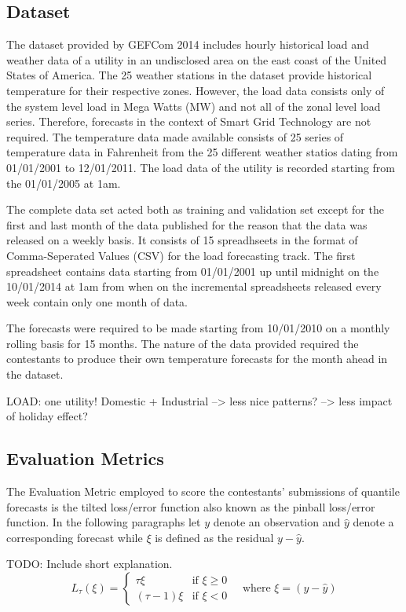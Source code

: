\documentclass[conference]{IEEEtran}
\begin{document}
\subsection{Dataset}
The dataset provided by GEFCom 2014 includes hourly historical load and weather data of a utility in an undisclosed area on the east coast of the United States of America. The 25 weather stations in the dataset provide historical temperature for their respective zones. However, the load data consists only of the system level load in Mega Watts (MW) and not all of the zonal level load series. Therefore, forecasts in the context of Smart Grid Technology are not required. The temperature data made available consists of 25 series of temperature data in Fahrenheit from the 25 different weather statios dating from 01/01/2001 to 12/01/2011. The load data of the utility is recorded starting from the 01/01/2005 at 1am.\par
The complete data set acted both as training and validation set except for the first and last month of the data published for the reason that the data was released on a weekly basis. It consists of 15 spreadhseets in the format of Comma-Seperated Values (CSV) for the load forecasting track. The first spreadsheet contains data starting from 01/01/2001 up until midnight on the 10/01/2014 at 1am from when on the incremental spreadsheets released every week contain only one month of data.\par
The forecasts were required to be made starting from 10/01/2010 on a monthly rolling basis for 15 months. The nature of the data provided required the contestants to produce their own temperature forecasts for the month ahead in the dataset.\par

LOAD: one utility! Domestic + Industrial --> less nice patterns? --> less impact of holiday effect?

%

\subsection{Evaluation Metrics}
The Evaluation Metric employed to score the contestants' submissions of quantile forecasts is the tilted loss/error function also known as the pinball loss/error function. In the following paragraphs let $y$ denote an observation and $\hat{y}$ denote a corresponding forecast while $\xi$ is defined as the residual $y-\hat{y}$.\par
TODO: Include short explanation.
\vspace*{3cm}
\[
  L_{\tau}(\xi)=\begin{cases} \tau \xi & \text{if } \xi \geq 0 \\
                                          (\tau-1)\xi & \text{if } \xi < 0 
                                  \end{cases} \quad\text{where } \xi=(y-\hat{y})
\]
\end{document}
